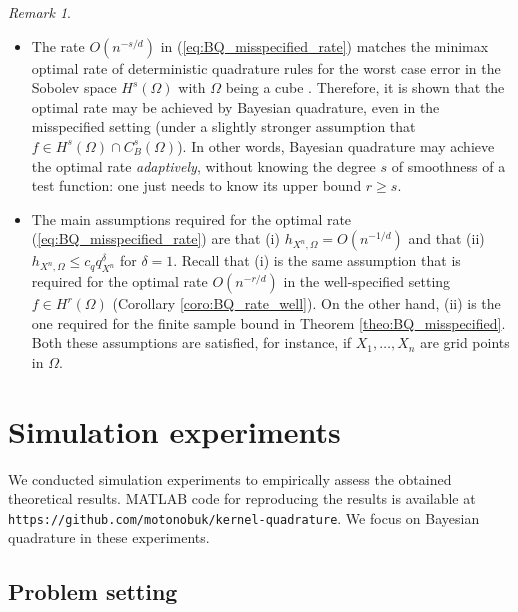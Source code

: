 \documentclass[11pt]{article}
\theoremstyle{remark}
\newtheorem{remark}{Remark}
\theoremstyle{example}
\theoremstyle{remark}
\newcommand{\citep}{\cite}
\begin{document}
\begin{remark} \rm
\begin{itemize}
\item 
The rate $O(n^{-s/d})$ in (\ref{eq:BQ_misspecified_rate}) matches the minimax optimal rate of deterministic quadrature rules for the worst case error in the Sobolev space $H^s(\Omega)$ with $\Omega$ being a cube \citep[Proposition 1 in Section 1.3.12]{Nov88}. 
Therefore, it is shown that the optimal rate may be achieved by Bayesian quadrature, even in the misspecified setting (under a slightly stronger assumption that $f \in H^s(\Omega) \cap C_B^s(\Omega)$).
In other words, Bayesian quadrature may achieve the optimal rate {\em adaptively}, without knowing the degree $s$ of smoothness of a test function: one just needs to know its upper bound $r \geq s$.\vspace{-1mm}

\item The main assumptions required for the optimal rate (\ref{eq:BQ_misspecified_rate}) are that (i) $h_{X^n,\Omega} = O(n^{-1/d})$ and that (ii) $h_{X^n,\Omega} \leq c_q q_{X^n}^\delta$ for $\delta = 1$.
Recall that (i) is the same assumption that is required for the optimal rate $O(n^{-r/d})$ in the well-specified setting $f \in H^r(\Omega)$ (Corollary \ref{coro:BQ_rate_well}). 
On the other hand, (ii) is the one required for the finite sample bound in Theorem \ref{theo:BQ_misspecified}. 
Both these assumptions are satisfied, for instance, if $X_1,\dots,X_n$ are grid points in $\Omega$. 
\end{itemize}
\end{remark}






\section{Simulation experiments} \label{sec:experiments}
We conducted simulation experiments to empirically assess the obtained theoretical results.
MATLAB code for reproducing the results is available at \verb|https://github.com/motonobuk/kernel-quadrature|.
We focus on Bayesian quadrature in these experiments.
\subsection{Problem setting} \label{sec:setting-simulation}
\end{document}
